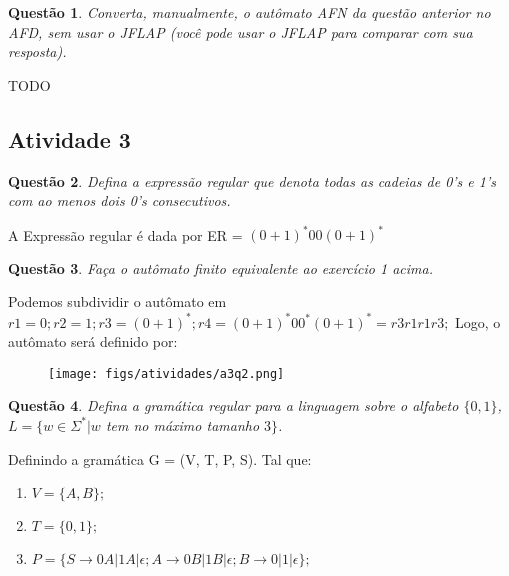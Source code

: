 \documentclass{article}
\newtheorem{problem}{Questão}
\begin{document}
\begin{problem} Converta, manualmente, o autômato AFN da questão anterior no AFD, sem usar o JFLAP (você pode usar o JFLAP para comparar com sua resposta).
\end{problem}

\begin{solution}
    TODO
\end{solution}
\subsection{Atividade 3}
\begin{problem} Defina a expressão regular que denota todas as cadeias de 0's e 1's com ao menos dois 0's consecutivos.
\end{problem}

\begin{solution}
    A Expressão regular é dada por ER = $(0 + 1)^*00(0 + 1)^*$
\end{solution}

\begin{problem} Faça o autômato finito equivalente ao exercício 1 acima.
\end{problem}

\begin{solution}
Podemos subdividir o autômato em $r1 = 0; r2 = 1; r3 = (0 + 1)^*; r4 = (0 + 1)^*00^*(0 + 1)^* = r3r1r1r3;$ Logo, o autômato será definido por:
    \begin{figure}[H]
        \centering
        \texttt{[image: figs/atividades/a3q2.png]}
    \end{figure}
\end{solution}

\begin{problem} Defina a gramática regular para a linguagem sobre o alfabeto $\{0,1\}$, $L = \{w\in \Sigma^{*} | w$ tem no máximo tamanho $3\}$.
\end{problem}

\begin{solution}
     Definindo a gramática G = (V, T, P, S). Tal que:
 
\begin{enumerate}[label=]
    \item $V = \{A,B\};$
    \item $T = \{0, 1\};$
    \item $P = \{S \rightarrow 0A | 1A | \epsilon; A \rightarrow 0B | 1B | \epsilon; B \rightarrow 0 | 1 | \epsilon \};$
\end{enumerate}
\end{solution}
\end{document}
